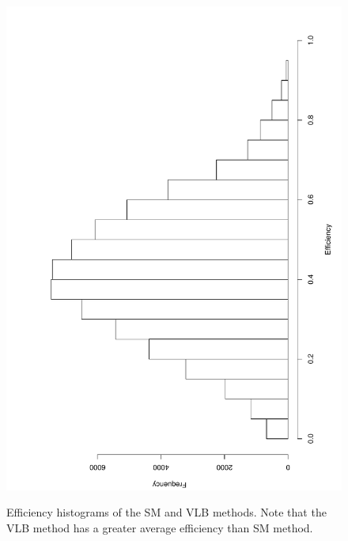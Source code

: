 \documentclass[10pt]{article}
\begin{document}
\begin{figure}[h]
{   \includegraphics[scale=0.25,angle=-90]{fig19}
  \label{fig:19}
  }
  \caption{Efficiency histograms of the SM and VLB methods. Note that the VLB 
method has a greater average efficiency than SM method.}
  \label{fig:1819}
\end{figure}
\end{document}
